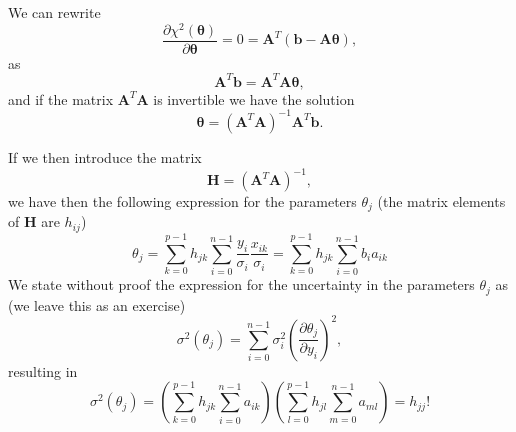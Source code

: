 \documentclass[%
oneside,                 %
final,                   %
10pt]{article}
\newenvironment{block_mdfboxadmon}[1][]{
\begin{block_mdfboxmdframed}[frametitle=#1]
}
{
\end{block_mdfboxmdframed}
}
\begin{document}

\begin{block_mdfboxadmon}[]

We can rewrite
\[
\frac{\partial \chi^2(\bm{\theta})}{\partial \bm{\theta}} = 0 = \bm{A}^T\left( \bm{b}-\bm{A}\bm{\theta}\right),  
\]
as
\[
\bm{A}^T\bm{b} = \bm{A}^T\bm{A}\bm{\theta},  
\]
and if the matrix $\bm{A}^T\bm{A}$ is invertible we have the solution
\[
\bm{\theta} =\left(\bm{A}^T\bm{A}\right)^{-1}\bm{A}^T\bm{b}.
\]
\end{block_mdfboxadmon} %




\begin{block_mdfboxadmon}[]

If we then introduce the matrix
\[
\bm{H} =  \left(\bm{A}^T\bm{A}\right)^{-1},
\]
we have then the following expression for the parameters $\theta_j$ (the matrix elements of $\bm{H}$ are $h_{ij}$)
\[
\theta_j = \sum_{k=0}^{p-1}h_{jk}\sum_{i=0}^{n-1}\frac{y_i}{\sigma_i}\frac{x_{ik}}{\sigma_i} = \sum_{k=0}^{p-1}h_{jk}\sum_{i=0}^{n-1}b_ia_{ik}
\]
We state without proof the expression for the uncertainty  in the parameters $\theta_j$ as (we leave this as an exercise)
\[
\sigma^2(\theta_j) = \sum_{i=0}^{n-1}\sigma_i^2\left( \frac{\partial \theta_j}{\partial y_i}\right)^2, 
\]
resulting in 
\[
\sigma^2(\theta_j) = \left(\sum_{k=0}^{p-1}h_{jk}\sum_{i=0}^{n-1}a_{ik}\right)\left(\sum_{l=0}^{p-1}h_{jl}\sum_{m=0}^{n-1}a_{ml}\right) = h_{jj}!
\]
\end{block_mdfboxadmon} %




\end{document}
